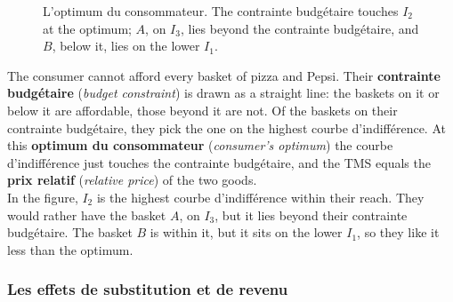 \begin{figure}[h!]
  \centering
  \caption*{\small L'optimum du consommateur. The contrainte budgétaire touches $I_2$
  at the optimum; $A$, on $I_3$, lies beyond the contrainte budgétaire, and $B$,
  below it, lies on the lower $I_1$.}
\end{figure}

The consumer cannot afford every basket of pizza and Pepsi. Their
\textbf{contrainte budgétaire} (\textit{budget constraint}) is drawn as a straight
line: the baskets on it or below it are affordable, those beyond it are not. Of the
baskets on their contrainte budgétaire, they pick the one on the highest courbe
d'indifférence. At this \textbf{optimum du consommateur} (\textit{consumer's
optimum}) the courbe d'indifférence just touches the contrainte budgétaire, and the
TMS equals the \textbf{prix relatif} (\textit{relative price}) of the two goods.\\

In the figure, $I_2$ is the highest courbe d'indifférence within their reach. They would
rather have the basket $A$, on $I_3$, but it lies beyond their contrainte budgétaire.
The basket $B$ is within it, but it sits on the lower $I_1$, so they like it less
than the optimum.

\subsubsection{Les effets de substitution et de revenu}

